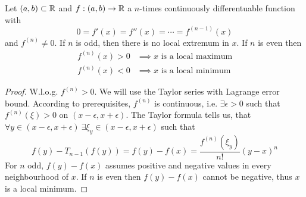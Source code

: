 \documentclass[../../script.tex]{subfiles}
\begin{document}
\begin{cor}
    Let $(a, b) \subset \mathbb{R}$ and $f: (a, b) \rightarrow \mathbb{R}$ a $n$-times continuously differentuable function with 
    \[
        0 = f'(x) = f''(x) = \cdots = f^{(n-1)}(x)
    \]
    and $f^{(n)} \ne 0$. If $n$ is odd, then there is no local extremum in $x$. If $n$ is even then 
    \begin{align*}
        f^{(n)}(x) > 0 &\implies x \text{ is a local maximum} \\
        f^{(n)}(x) < 0 &\implies x \text{ is a local minimum}
    \end{align*}
\end{cor}
\begin{proof}
    W.l.o.g. $f^{(n)} > 0$. We will use the Taylor series with Lagrange error bound. 
    According to prerequisites, $f^{(n)}$ is continuous, i.e. $\exists \epsilon > 0$ such that $f^{(n)}(\xi) > 0$ on $(x - \epsilon, x + \epsilon)$.
    The Taylor formula tells us, that $\forall y \in (x - \epsilon, x + \epsilon) ~\exists \xi_y \in (x - \epsilon, x + \epsilon)$ such that
    \begin{equation}
        f(y) - T_{n-1}(f(y)) = f(y) - f(x) = \frac{f^{(n)}(\xi_y)}{n!} (y - x)^n
    \end{equation}
    For $n$ odd, $f(y) - f(x)$ assumes positive and negative values in every neighbourhood of $x$. If $n$ is even then $f(y) - f(x)$ cannot be negative, thus $x$ is a local minimum.
\end{proof}
\end{document}
